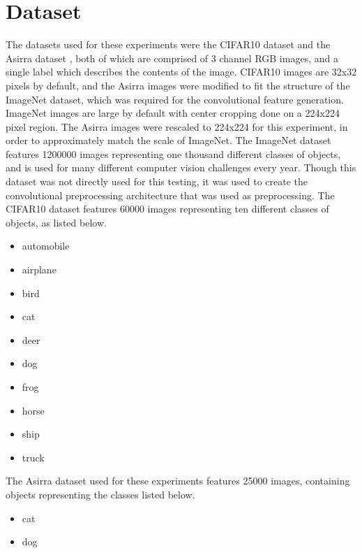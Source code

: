 \documentclass[journal]{IEEEtran}
\begin{document}
\section{Dataset}
The datasets used for these experiments were the CIFAR10 dataset \cite{CIFAR10}
and the Asirra dataset \cite{Asirra}, both of which are comprised of 3 channel
RGB  images, and a single label which describes the contents of the image.
CIFAR10 images are 32x32 pixels by default, and the Asirra images were modified
to fit the structure of the ImageNet dataset, which was required for the 
convolutional feature generation. ImageNet images are large by default with
center cropping done on a 224x224 
pixel region. The Asirra images were rescaled to 224x224 for this experiment,
in order to approximately match the scale of ImageNet.
The ImageNet dataset features 1200000 images representing 
one thousand different classes of objects, and is used for many different 
computer vision challenges every year. Though this dataset was not directly
used for this testing, it was used to create the convolutional preprocessing 
architecture that was used as preprocessing. The CIFAR10 dataset features 60000 
images representing ten different classes of objects, as listed below.
\begin{itemize}
\item automobile
\item airplane
\item bird 
\item cat
\item deer
\item dog
\item frog
\item horse
\item ship
\item truck
\end{itemize}
The Asirra dataset used for these experiments features 25000 images, containing
objects representing the classes listed below.
\begin{itemize}
\item cat
\item dog
\end{itemize}
\end{document}
